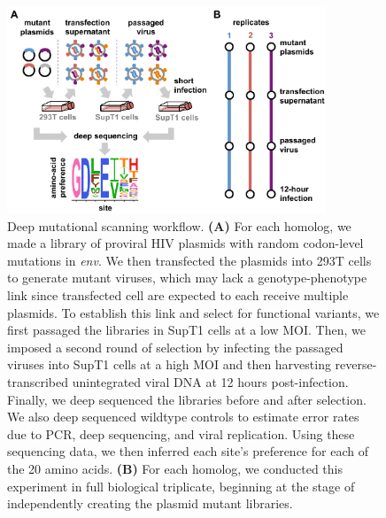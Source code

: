 \documentclass[9pt]{elife}
\begin{document}
\begin{figure}
\centerline{\includegraphics[width=0.85\textwidth]{figures/dms_schematic/dms_schematic.pdf}}
\caption{\label{fig:dms_schematic}
Deep mutational scanning workflow.
{\bf (A)} For each homolog, we made a library of proviral HIV plasmids with random codon-level mutations in \textit{env}.
We then transfected the plasmids into 293T cells to generate mutant viruses, which may lack a genotype-phenotype link since transfected cell are expected to each receive multiple plasmids.
To establish this link and select for functional variants, we first passaged the libraries in SupT1 cells at a low MOI.
Then, we imposed a second round of selection by infecting the passaged viruses into SupT1 cells at a high MOI and then harvesting reverse-transcribed unintegrated viral DNA at 12 hours post-infection.
Finally, we deep sequenced the libraries before and after selection.
We also deep sequenced wildtype controls to estimate error rates due to PCR, deep sequencing, and viral replication.
Using these sequencing data, we then inferred each site's preference for each of the 20 amino acids.
{\bf (B)} For each homolog, we conducted this experiment in full biological triplicate, beginning at the stage of independently creating the plasmid mutant libraries.
}
\end{figure}
\end{document}
